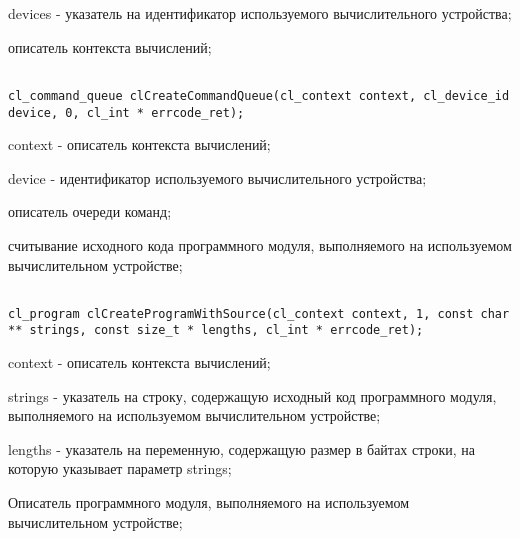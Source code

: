 \begin{enumerate}
		\openclend
		{
			\item devices - указатель на идентификатор используемого вычислительного устройства;
			\errcode
		}
		{описатель контекста вычислений;}


		
\begin{lstlisting}

cl_command_queue clCreateCommandQueue(cl_context context, cl_device_id device, 0, cl_int * errcode_ret);

\end{lstlisting}

		\openclend
		{
			\item context - описатель контекста вычислений;
			\item device - идентификатор используемого вычислительного устройства;
			\errcode
		}
		{описатель очереди команд;}


		\item считывание исходного кода программного модуля, выполняемого на используемом вычислительном устройстве;



\begin{lstlisting}

cl_program clCreateProgramWithSource(cl_context context, 1, const char ** strings, const size_t * lengths, cl_int * errcode_ret);

\end{lstlisting}

		\openclend
		{
			\item context - описатель контекста вычислений;
			\item strings - указатель на строку, содержащую исходный код программного модуля, выполняемого на используемом вычислительном устройстве;
			\item lengths - указатель на переменную, содержащую размер в байтах строки, на которую указывает параметр strings;
			\errcodeslb
		}
		{Описатель программного модуля, выполняемого на используемом вычислительном устройстве;}


\end{enumerate}
